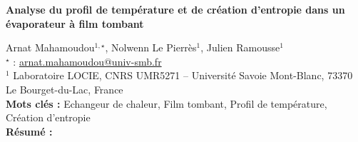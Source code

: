 


    \newpage


%
\begin{flushleft}
\addtocounter{section}{1}
{\Large \textbf{Analyse du profil de température et de création d'entropie dans un évaporateur à film tombant}}\label{ref:40}
\end{flushleft}
%
Arnat Mahamoudou$^{1,\star}$, Nolwenn Le Pierrès$^{1}$, Julien Ramousse$^{1}$\\[2mm]
$^{\star}$ \Letter : \url{arnat.mahamoudou@univ-smb.fr}\\[2mm]
{\footnotesize $^{1}$ Laboratoire LOCIE, CNRS UMR5271 – Université Savoie Mont-Blanc, 73370 Le Bourget-du-Lac, France}\\
[4mm]
%
\noindent \textbf{Mots clés : } Echangeur de chaleur, Film tombant, Profil de température, Création d'entropie\\[4mm]
%
\noindent \textbf{Résumé : } 

